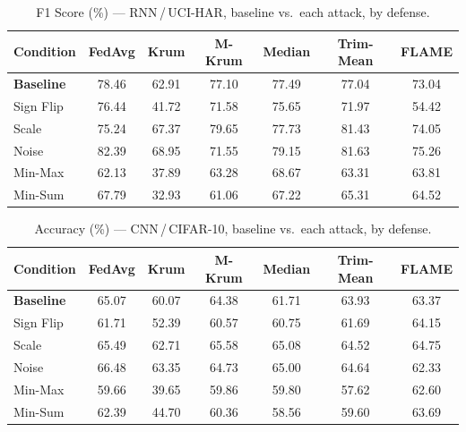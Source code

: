 \begin{table}[t]
\centering
\caption{F1 Score (\%) --- RNN\,/\,UCI-HAR, baseline vs.\ each attack, by defense.}
\label{tab:rnn_f1}
\footnotesize
\begin{tabular}{lcccccc}
\toprule
Condition & FedAvg & Krum & M-Krum & Median & Trim-Mean & FLAME \\
\midrule
\textbf{Baseline} & 78.46 & 62.91 & 77.10 & 77.49 & 77.04 & 73.04 \\
\midrule
Sign Flip & 76.44 & 41.72 & 71.58 & 75.65 & 71.97 & 54.42 \\
Scale & 75.24 & 67.37 & 79.65 & 77.73 & 81.43 & 74.05 \\
Noise & 82.39 & 68.95 & 71.55 & 79.15 & 81.63 & 75.26 \\
Min-Max & 62.13 & 37.89 & 63.28 & 68.67 & 63.31 & 63.81 \\
Min-Sum & 67.79 & 32.93 & 61.06 & 67.22 & 65.31 & 64.52 \\
\bottomrule
\end{tabular}
\end{table}

\begin{table}[t]
\centering
\caption{Accuracy (\%) --- CNN\,/\,CIFAR-10, baseline vs.\ each attack, by defense.}
\label{tab:cnn_accuracy}
\footnotesize
\begin{tabular}{lcccccc}
\toprule
Condition & FedAvg & Krum & M-Krum & Median & Trim-Mean & FLAME \\
\midrule
\textbf{Baseline} & 65.07 & 60.07 & 64.38 & 61.71 & 63.93 & 63.37 \\
\midrule
Sign Flip & 61.71 & 52.39 & 60.57 & 60.75 & 61.69 & 64.15 \\
Scale & 65.49 & 62.71 & 65.58 & 65.08 & 64.52 & 64.75 \\
Noise & 66.48 & 63.35 & 64.73 & 65.00 & 64.64 & 62.33 \\
Min-Max & 59.66 & 39.65 & 59.86 & 59.80 & 57.62 & 62.60 \\
Min-Sum & 62.39 & 44.70 & 60.36 & 58.56 & 59.60 & 63.69 \\
\bottomrule
\end{tabular}
\end{table}

